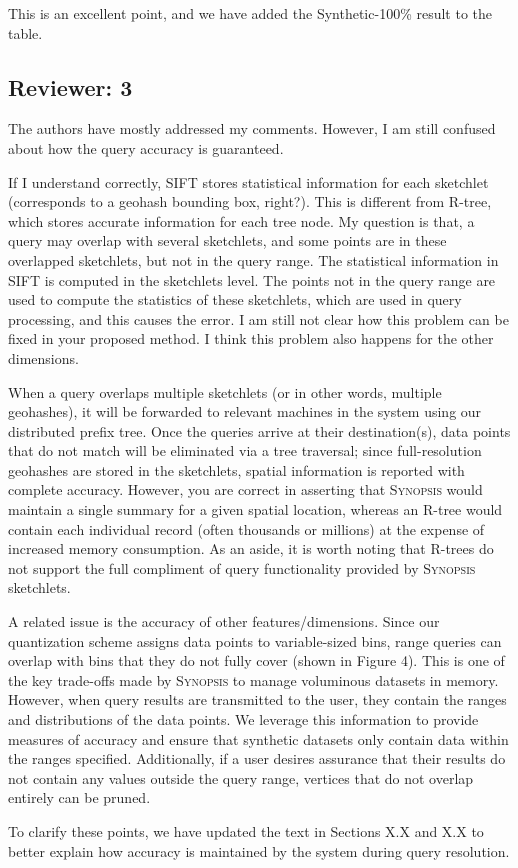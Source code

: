 \documentclass{article}
\begin{document}
\begin{tcolorbox}
    This is an excellent point, and we have added the Synthetic-100\% result to the table.
\end{tcolorbox}

\subsection*{Reviewer: 3}\label{reviewer-3}

The authors have mostly addressed my comments. However, I am still confused about how the query accuracy is guaranteed.

If I understand correctly, SIFT stores statistical information for each sketchlet (corresponds to a geohash bounding box, right?). This is different from R-tree, which stores accurate information for each tree node. My question is that, a query may overlap with several sketchlets, and some points are in these overlapped sketchlets, but not in the query range. The statistical information in SIFT is computed in the sketchlets level. The points not in the query range are used to compute the statistics of these sketchlets, which are used in query processing, and this causes the error. I am still not clear how this problem can be fixed in your proposed method. I think this problem also happens for the other dimensions.

\begin{tcolorbox}
    When a query overlaps multiple sketchlets (or in other words, multiple geohashes), it will be forwarded to relevant machines in the system using our distributed prefix tree. Once the queries arrive at their destination(s), data points that do not match will be eliminated via a tree traversal; since full-resolution geohashes are stored in the sketchlets, spatial information is reported with complete accuracy. However, you are correct in asserting that \textsc{Synopsis} would maintain a single summary for a given spatial location, whereas an R-tree would contain each individual record (often thousands or millions) at the expense of increased memory consumption. As an aside, it is worth noting that R-trees do not support the full compliment of query functionality provided by \textsc{Synopsis} sketchlets.

    A related issue is the accuracy of other features/dimensions. Since our quantization scheme assigns data points to variable-sized bins, range queries can overlap with bins that they do not fully cover (shown in Figure 4). This is one of the key trade-offs made by \textsc{Synopsis} to manage voluminous datasets in memory. However, when query results are transmitted to the user, they contain the ranges and distributions of the data points. We leverage this information to provide measures of accuracy and ensure that synthetic datasets only contain data within the ranges specified. Additionally, if a user desires assurance that their results do not contain any values outside the query range, vertices that do not overlap entirely can be pruned.

    To clarify these points, we have updated the text in Sections X.X and X.X to better explain how accuracy is maintained by the system during query resolution.
\end{tcolorbox}
\end{document}
